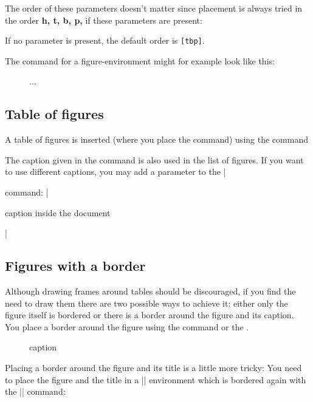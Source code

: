 The order of these parameters doesn't matter since placement is always tried in the order \textbf{h, t, b, p,} if these parameters are present:

If no parameter is present, the default order is  \texttt{[tbp]}.


The command for a figure-environment might for example look like this:

\begin{teX}
\begin{figure}[htbp]
...
\end{figure}
\end{teX}



\subsection{Table of figures}
A table of figures is inserted (where you place the command) using the command


\begin{teX}
   \listoffigures
\end{teX}

The caption given in the  command is also used in the list of figures. 
If you want to use different captions, you may add a parameter to the |\caption| command:
|\caption[caption for listoffigures]{caption inside the document}|


\subsection{Figures with a border}

Although drawing frames around tables should be discouraged, if you find the need
to draw them there are  two possible ways to achieve it: either only the figure itself is bordered or there is a border around the figure and its caption. You place a border around the figure using the \cmd{\fbox} command or the \cmd{\framebox}.

\begin{teX}
\begin{figure}[htbp]
  \centering
  \caption{caption}
  \label{Labelname}
\end{figure}
\end{teX}

Placing a border around the figure and its title is a little more tricky: You need to place the figure and the title in a |\minipage| environment which is bordered again with the |\fbox| command:

